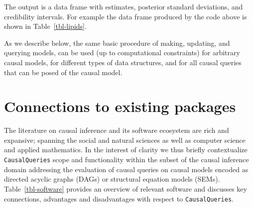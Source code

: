 \documentclass[
  11pt,
  article]{jss}
\begin{document}
The output is a data frame with estimates, posterior standard
deviations, and credibility intervals. For example the data frame
produced by the code above is shown in Table~\ref{tbl-lipids}.

As we describe below, the same basic procedure of making, updating, and
querying models, can be used (up to computational constraints) for
arbitrary causal models, for different types of data structures, and for
all causal queries that can be posed of the causal model.

\hypertarget{connections-to-existing-packages}{%
\section{Connections to existing
packages}\label{connections-to-existing-packages}}

The literature on causal inference and its software ecosystem are rich
and expansive; spanning the social and natural sciences as well as
computer science and applied mathematics. In the interest of clarity we
thus briefly contextualize \texttt{CausalQueries} scope and
functionality within the subset of the causal inference domain
addressing the evaluation of causal queries on causal models encoded as
directed acyclic graphs (DAGs) or structural equation models (SEMs).
Table~\ref{tbl-software} provides an overview of relevant software and
discusses key connections, advantages and disadvantages with respect to
\texttt{CausalQueries}.
\end{document}
